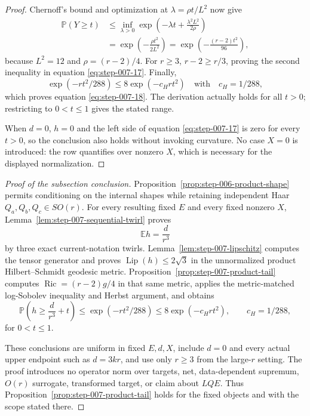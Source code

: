 \begin{proof}
Chernoff's bound and optimization at \(\lambda=\rho t/L^2\) now give
\begin{equation}
\begin{aligned}
  \mathbb P(Y\ge t)
  &\le\inf_{\lambda>0}
    \exp\!\left(-\lambda t+\frac{\lambda^2L^2}{2\rho}\right)\\
  &=\exp\!\left(-\frac{\rho t^2}{2L^2}\right)
   =\exp\!\left(-\frac{(r-2)t^2}{96}\right),
\end{aligned}\label{eq:step-007-27}
\end{equation}
because \(L^2=12\) and \(\rho=(r-2)/4\). For \(r\ge3\),
\(r-2\ge r/3\), proving the second inequality in equation \eqref{eq:step-007-17}. Finally,
\begin{equation}
  \exp(-rt^2/288)
  \le8\exp(-c_Hrt^2)
  \quad\text{with}\quad c_H=1/288,                         \label{eq:step-007-28}
\end{equation}
which proves equation \eqref{eq:step-007-18}. The derivation actually holds for all
\(t>0\); restricting to \(0<t\le1\) gives the stated range.

When \(d=0\), \(h=0\) and the left side of equation \eqref{eq:step-007-17} is zero for every
\(t>0\), so the conclusion also holds without invoking curvature. No case
\(X=0\) is introduced: the row quantifies over nonzero \(X\), which
is necessary for the displayed normalization. 

\end{proof}

\begin{proof}[Proof of the subsection conclusion]

Proposition~\ref{prop:step-006-product-shape} permits conditioning
on the internal shapes while retaining independent Haar
\(Q_a,Q_b,Q_c\in SO(r)\). For every resulting fixed \(E\) and every fixed
nonzero \(X\), Lemma~\ref{lem:step-007-sequential-twirl} proves
\[
  \mathbb Eh=\frac d{r^3}
\]
by three exact current-notation twirls. Lemma~\ref{lem:step-007-lipschitz}
computes the tensor generator and proves
\(\operatorname{Lip}(h)\le2\sqrt3\) in the unnormalized product
Hilbert--Schmidt geodesic metric. Proposition~\ref{prop:step-007-product-tail}
computes \(\operatorname{Ric}=(r-2)g/4\) in that same metric, applies the
metric-matched log-Sobolev inequality and Herbst argument, and obtains
\[
  \mathbb P\!\left(h\ge\frac d{r^3}+t\right)
  \le\exp(-rt^2/288)
  \le8\exp(-c_Hrt^2),
  \qquad c_H=1/288,
\]
for \(0<t\le1\).

These conclusions are uniform in fixed \(E,d,X\), include \(d=0\) and every
actual upper endpoint such as \(d=3kr\), and use only \(r\ge3\) from the
large-\(r\) setting. The proof introduces no operator norm over targets, net,
data-dependent supremum, \(O(r)\) surrogate, transformed target, or claim
about \(LQE\). Thus Proposition~\ref{prop:step-007-product-tail} holds for
the fixed objects and with the scope stated there.

\end{proof}

